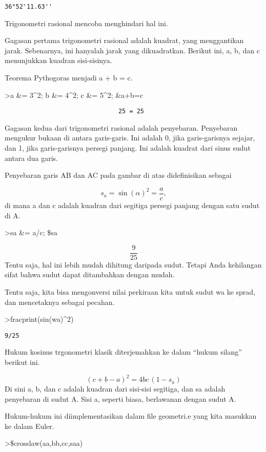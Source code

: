 \documentclass[
]{book}
\begin{document}
\begin{verbatim}
36°52'11.63''
\end{verbatim}

Trigonometri rasional mencoba menghindari hal ini.

Gagasan pertama trigonometri rasional adalah kuadrat, yang menggantikan jarak. Sebenarnya, ini hanyalah jarak yang dikuadratkan. Berikut ini, a, b, dan c menunjukkan kuadran sisi-sisinya.

Teorema Pythogoras menjadi a + b = c.

\textgreater a \&= 3\^{}2; b \&= 4\^{}2; c \&= 5\^{}2; \&a+b=c

\begin{verbatim}
                               25 = 25
\end{verbatim}

Gagasan kedua dari trigonometri rasional adalah penyebaran. Penyebaran mengukur bukaan di antara garis-garis. Ini adalah 0, jika garis-garisnya sejajar, dan 1, jika garis-garisnya persegi panjang. Ini adalah kuadrat dari sinus sudut antara dua garis.

Penyebaran garis AB dan AC pada gambar di atas didefinisikan sebagai

\[s_a = \sin(\alpha)^2 = \frac{a}{c},\]di mana a dan c adalah kuadran dari segitiga persegi panjang dengan satu sudut di A.

\textgreater sa \&= a/c; \$sa

\[\frac{9}{25}\]Tentu saja, hal ini lebih mudah dihitung daripada sudut. Tetapi Anda kehilangan sifat bahwa sudut dapat ditambahkan dengan mudah.

Tentu saja, kita bisa mengonversi nilai perkiraan kita untuk sudut wa ke sprad, dan mencetaknya sebagai pecahan.

\textgreater fracprint(sin(wa)\^{}2)

\begin{verbatim}
9/25
\end{verbatim}

Hukum kosinus trgonometri klasik diterjemahkan ke dalam ``hukum silang'' berikut ini.

\[(c+b-a)^2 = 4 b c \, (1-s_a)\]Di sini a, b, dan c adalah kuadran dari sisi-sisi segitiga, dan sa adalah penyebaran di sudut A. Sisi a, seperti biasa, berlawanan dengan sudut A.

Hukum-hukum ini diimplementasikan dalam file geometri.e yang kita masukkan ke dalam Euler.

\textgreater\$crosslaw(aa,bb,cc,saa)
\end{document}
